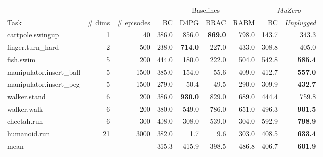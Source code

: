 \documentclass{article}
\newcommand{\muzero}{\emph{MuZero}}
\newcommand{\mzunplugged}{\emph{MuZero Unplugged}}
\begin{document}
\begin{table*}[h]
\begin{center}\begin{tabularx}{0.9\textwidth}{l@{\hspace{0pt}}rr|rrrr|rr}
  \toprule
   & & & \multicolumn{4}{c|}{Baselines} & \multicolumn{2}{c}{\muzero{}} \\
  Task & \# dims & \# episodes & BC & D4PG & BRAC & RABM & BC & \emph{Unplugged} \\
\midrule
cartpole.swingup & 1 & 40  & 386.0 & 856.0 & \textbf{869.0} & 798.0 & 143.7 & 343.3 \\
finger.turn\_hard & 2 & 500  & 238.0 & \textbf{714.0} & 227.0 & 433.0 & 308.8 & 405.0 \\
fish.swim & 5 & 200  & 444.0 & 180.0 & 222.0 & 504.0 & 542.8 & \textbf{585.4} \\
manipulator.insert\_ball & 5 & 1500  & 385.0 & 154.0 & 55.6 & 409.0 & 412.7 & \textbf{557.0} \\
manipulator.insert\_peg & 5 & 1500  & 279.0 & 50.4 & 49.5 & 290.0 & 309.9 & \textbf{432.7} \\
walker.stand & 6 & 200  & 386.0 & \textbf{930.0} & 829.0 & 689.0 & 444.4 & 759.8 \\
walker.walk & 6 & 200  & 380.0 & 549.0 & 786.0 & 651.0 & 496.3 & \textbf{901.5} \\
cheetah.run & 6 & 300  & 408.0 & 308.0 & 539.0 & 304.0 & 592.9 & \textbf{798.9} \\
humanoid.run & 21 & 3000  & 382.0 & 1.7 & 9.6 & 303.0 & 408.5 & \textbf{633.4} \\
\midrule
mean & &  & 365.3 & 415.9 & 398.5 & 486.8 & 406.7 & \textbf{601.9}\\
\bottomrule
\end{tabularx}
\end{center}
 \caption{
\label{tab:rl-unplugged-mujoco}
\textbf{Results for DM Control benchmark from RL Unplugged}. Mean final score on 9 DM Control tasks, as well as mean score across all tasks. First three columns indicate task, action dimensonality and dataset size, subsequent four columns reproduce baseline results from \cite{rl_unplugged}. Final columns show performance of Behaviour Cloning (BC) with the \muzero{} network and results for \mzunplugged{}. As the data sets for the DM Control tasks are very small and vary a hundredfold between tasks, to keep the number of model parameters per datapoint constant and prevent memorisation, we scaled the neural network according to $channels = \sqrt{\frac{datapoints}{layers}}$.
}
\end{table*}
\end{document}

